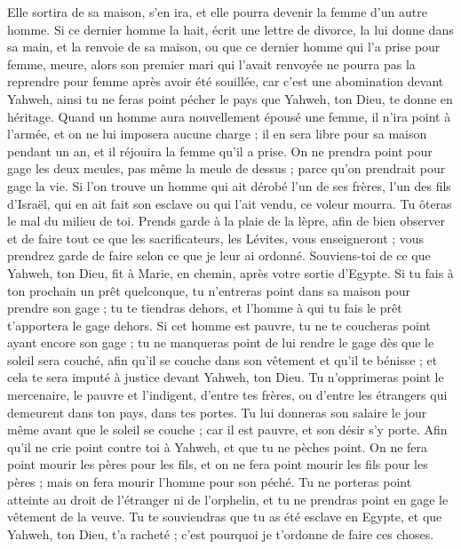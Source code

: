 \begin{multicols}{2}
Elle sortira de sa maison, s’en ira, et elle pourra devenir la femme d’un autre homme.
Si ce dernier homme la hait, écrit une lettre de divorce, la lui donne dans sa main, et la renvoie de sa maison, ou que ce dernier homme qui l'a prise pour femme, meure,
alors son premier mari qui l'avait renvoyée ne pourra pas la reprendre pour femme après avoir été souillée, car c'est une abomination devant Yahweh, ainsi tu ne feras point pécher le pays que Yahweh, ton Dieu, te donne en héritage.
Quand un homme aura nouvellement épousé une femme, il n'ira point à l’armée, et on ne lui imposera aucune charge ; il en sera libre pour sa maison pendant un an, et il réjouira la femme qu'il a prise.
On ne prendra point pour gage les deux meules, pas même la meule de dessus ; parce qu'on prendrait pour gage la vie.
Si l’on trouve un homme qui ait dérobé l'un de ses frères, l'un des fils d'Israël, qui en ait fait son esclave ou qui l’ait vendu, ce voleur mourra. Tu ôteras le mal du milieu de toi.
Prends garde à la plaie de la lèpre, afin de bien observer et de faire tout ce que les sacrificateurs, les Lévites, vous enseigneront ; vous prendrez garde de faire selon ce que je leur ai ordonné.
Souviens-toi de ce que Yahweh, ton Dieu, fit à Marie, en chemin, après votre sortie d'Egypte.
Si tu fais à ton prochain un prêt quelconque, tu n'entreras point dans sa maison pour prendre son gage ;
tu te tiendras dehors, et l'homme à qui tu fais le prêt t'apportera le gage dehors.
Si cet homme est pauvre, tu ne te coucheras point ayant encore son gage ;
tu ne manqueras point de lui rendre le gage dès que le soleil sera couché, afin qu'il se couche dans son vêtement et qu'il te bénisse ; et cela te sera imputé à justice devant Yahweh, ton Dieu.
Tu n’opprimeras point le mercenaire, le pauvre et l’indigent, d'entre tes frères, ou d'entre les étrangers qui demeurent dans ton pays, dans tes portes.
Tu lui donneras son salaire le jour même avant que le soleil se couche ; car il est pauvre, et son désir s’y porte. Afin qu'il ne crie point contre toi à Yahweh, et que tu ne pèches point.
On ne fera point mourir les pères pour les fils, et on ne fera point mourir les fils pour les pères ; mais on fera mourir l’homme pour son péché.
Tu ne porteras point atteinte au droit de l'étranger ni de l'orphelin, et tu ne prendras point en gage le vêtement de la veuve.
Tu te souviendras que tu as été esclave en Egypte, et que Yahweh, ton Dieu, t'a racheté ; c'est pourquoi je t’ordonne de faire ces choses.

\end{multicols}
